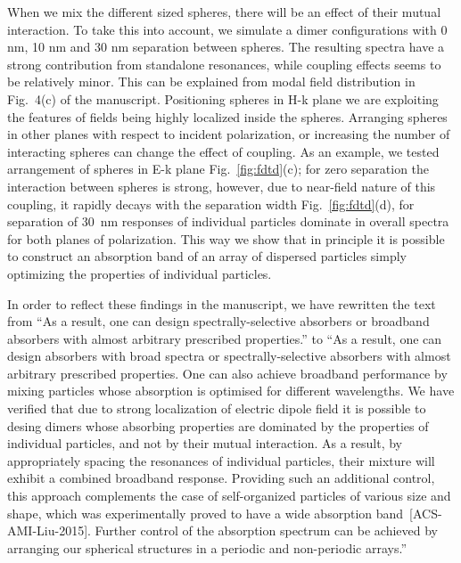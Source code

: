 \documentclass[a4paper]{article}
\begin{document}
When we mix the different sized spheres, there will be an effect of
their mutual interaction. To take this into account, we simulate a
dimer configurations with 0 nm, 10 nm and 30 nm separation between
spheres.  The resulting spectra have a strong contribution from
standalone resonances, while coupling effects seems to be relatively
minor. This can be explained from modal field distribution in
Fig.~4(c) of the manuscript. Positioning spheres in H-k plane we are
exploiting the features of fields being highly localized inside the
spheres. Arranging spheres in other planes with respect to incident
polarization, or increasing the number of interacting spheres can
change the effect of coupling. As an example, we tested arrangement of
spheres in E-k plane Fig.~\ref{fig:fdtd}(c); for zero separation the
interaction between spheres is strong, however, due to near-field
nature of this coupling, it rapidly decays with the separation width
Fig.~\ref{fig:fdtd}(d), for separation of 30~nm responses of
individual particles dominate in overall spectra for both planes of
polarization. This way we show that in principle it is possible to
construct an absorption band of an array of dispersed particles simply
optimizing the properties of individual particles.

In order to reflect these findings in the manuscript, we have
rewritten the text from ``As a result, one can design
spectrally-selective absorbers or broadband absorbers with almost
arbitrary prescribed properties.'' to ``As a result, one can design
absorbers with broad spectra or spectrally-selective absorbers with
almost arbitrary prescribed properties.  One can also achieve
broadband performance by mixing particles whose absorption is
optimised for different wavelengths. We have verified that due to
strong localization of electric dipole field it is possible to desing
dimers whose absorbing properties are dominated by the properties of
individual particles, and not by their mutual interaction. As a
result, by appropriately spacing the resonances of individual
particles, their mixture will exhibit a combined broadband
response. Providing such an additional control, this approach
complements the case of self-organized particles of various size and
shape, which was experimentally proved to have a wide absorption
band~[ACS-AMI-Liu-2015]. %
Further control of the absorption spectrum can be achieved by
arranging our spherical structures in a periodic and non-periodic
arrays.''
\end{document}
